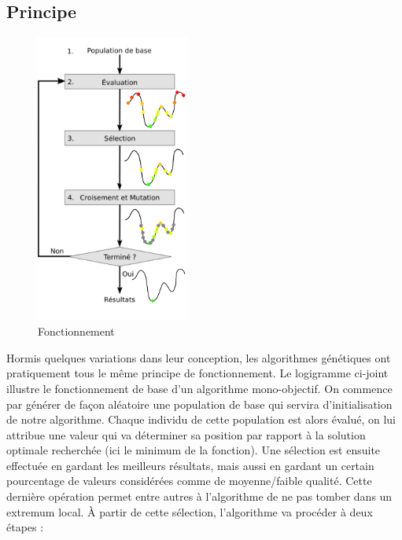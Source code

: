 \documentclass[12pt]{report}
\begin{document}
      \subsection{Principe}
        \begin{figure}
        \centering
        \includegraphics[width=5cm]{img/schema_algo_single.png}
        \caption{Fonctionnement}
        \end{figure}
        Hormis quelques variations dans leur conception, les algorithmes génétiques ont pratiquement tous le même principe de fonctionnement.
        Le logigramme ci-joint illustre le fonctionnement de base d'un algorithme mono-objectif.
        On commence par générer de façon aléatoire une population de base qui servira d'initialisation de notre algorithme.
        Chaque individu de cette population est alors évalué, on lui attribue une valeur qui va déterminer sa position par rapport à la solution optimale recherchée (ici le minimum de la fonction).
        Une sélection est ensuite effectuée en gardant les meilleurs résultats, mais aussi en gardant un certain pourcentage de valeurs considérées comme de moyenne/faible qualité. Cette dernière opération permet entre autres à l'algorithme de ne pas tomber dans un extremum local.
        À partir de cette sélection, l'algorithme va procéder à deux étapes :
\end{document}
